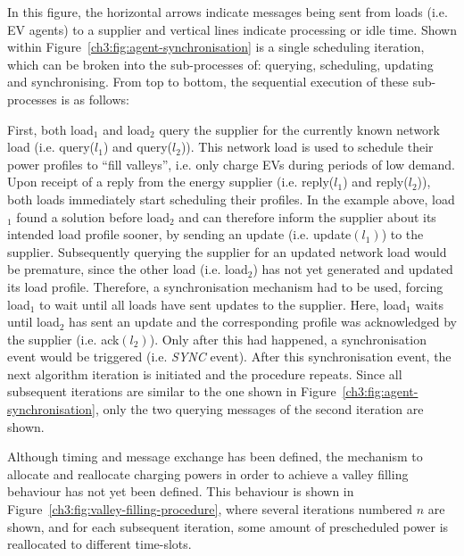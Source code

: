 

In this figure, the horizontal arrows indicate messages being sent from loads (i.e. EV agents) to a supplier and vertical lines indicate processing or idle time.
Shown within Figure~\ref{ch3:fig:agent-synchronisation} is a single scheduling iteration, which can be broken into the sub-processes of: querying, scheduling, updating and synchronising.
From top to bottom, the sequential execution of these sub-processes is as follows:

First, both load$_1$ and load$_2$ query the supplier for the currently known network load (i.e. query($l_1$) and query($l_2$)).
This network load is used to schedule their power profiles to ``fill valleys'', i.e. only charge EVs during periods of low demand.
Upon receipt of a reply from the energy supplier (i.e. reply($l_1$) and reply($l_2$)), both loads immediately start scheduling their profiles.
In the example above, load$_1$ found a solution before load$_2$ and can therefore inform the supplier about its intended load profile sooner, by sending an update (i.e. update$(l_1)$) to the supplier.
Subsequently querying the supplier for an updated network load would be premature, since the other load (i.e. load$_2$) has not yet generated and updated its load profile.
Therefore, a synchronisation mechanism had to be used, forcing load$_1$ to wait until all loads have sent updates to the supplier.
Here, load$_1$ waits until load$_2$ has sent an update and the corresponding profile was acknowledged by the supplier (i.e. ack$(l_2)$).
Only after this had happened, a synchronisation event would be triggered (i.e. \textit{SYNC} event).
After this synchronisation event, the next algorithm iteration is initiated and the procedure repeats.
Since all subsequent iterations are similar to the one shown in Figure~\ref{ch3:fig:agent-synchronisation}, only the two querying messages of the  second iteration are shown.

Although timing and message exchange has been defined, the mechanism to allocate and reallocate charging powers in order to achieve a valley filling behaviour has not yet been defined.
This behaviour is shown in Figure~\ref{ch3:fig:valley-filling-procedure}, where several iterations numbered $n$ are shown, and for each subsequent iteration, some amount of prescheduled power is reallocated to different time-slots.




